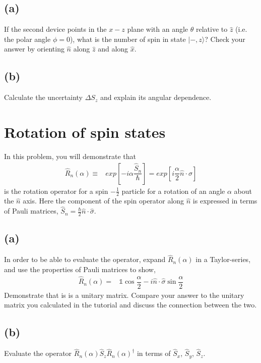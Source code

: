 \documentclass[12pt, a4paper]{article}
\begin{document}
\subsection*{(a)}
If the second device points in the $x - z$ plane with an angle $\theta$ relative to $\hat{z}$ (i.e. the polar angle $\phi =0$), what is the number of spin in state $|-,z\rangle$? Check your answer by orienting $\hat{n}$ along $\hat{z}$ and along $\hat{x}$.

\subsection*{(b)}
Calculate the uncertainty $\Delta S_z$ and explain its angular dependence.



\section{Rotation of spin states}
In this problem, you will demonstrate that
\begin{align*}
\hat{R}_n (\alpha) \equiv& exp\left[-i\alpha\dfrac{\hat{S}_n}{\hbar}\right] = exp\left[i\dfrac{\alpha}{2}\hat{n}\cdot{\sigma}\right]
\end{align*}
is the rotation operator for a spin $-\frac{1}{2}$ particle for a rotation of an angle $\alpha$ about the $\hat{n}$ axis. Here the component of the spin operator along $\hat{n}$ is expressed in terms of Pauli matrices, $ \hat{S}_n = \frac{\hbar}{2}\hat{n}\cdot\hat{\sigma}$.

\subsection*{(a)}
In order to be able to evaluate the operator, expand $\hat{R}_n(\alpha)$ in a Taylor-series, and use the properties of Pauli matrices to show,
\begin{align*}
\hat{R}_n (\alpha) =& \mathds{1} \cos\dfrac{\alpha}{2}-i\hat{n}\cdot\hat{\sigma}\sin\dfrac{\alpha}{2}
\end{align*}
Demonstrate that is is a unitary matrix. Compare your answer to the unitary matrix you calculated in the tutorial and discuss the connection between the two. 

\subsection*{(b)}
Evaluate the operator $\hat{R}_n(\alpha)\hat{S}_z\hat{R}_n(\alpha)^\dagger$ in terms of $\hat{S}_x$, $\hat{S}_y$, $\hat{S}_z$.
\end{document}
